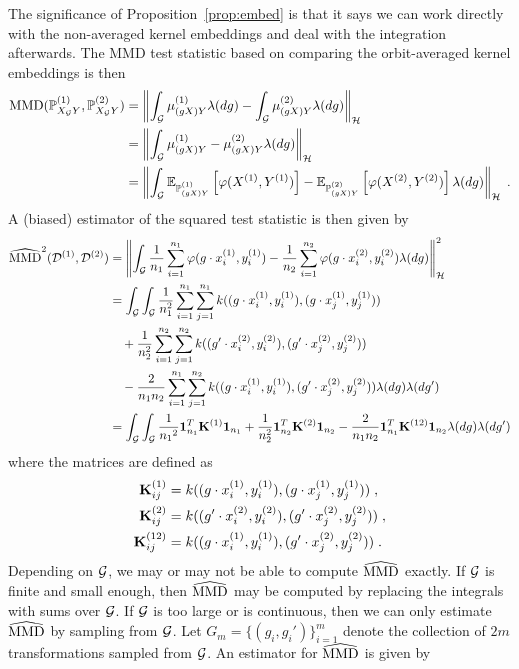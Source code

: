 The significance of Proposition~\ref{prop:embed} is that it says we can work directly with the non-averaged kernel embeddings and deal with the integration afterwards. The MMD test statistic based on comparing the orbit-averaged kernel embeddings is then
\begin{align*}
\mathrm{MMD}(\mathbb{P}_{X_{\mathcal{G}} Y}^{(1)},\mathbb{P}_{X_{\mathcal{G}} Y}^{(2)}) &= \left\|\int_{\mathcal{G}}\mu_{(gX)Y}^{(1)}\lambda(dg) - \int_{\mathcal{G}}\mu_{(gX)Y}^{(2)}\lambda(dg)\right\|_{\mathcal{H}} \\
&= \left\|\int_{\mathcal{G}}\mu_{(gX)Y}^{(1)} - \mu_{(gX)Y}^{(2)}\lambda(dg)\right\|_{\mathcal{H}} \\
&= \left\|\int_{\mathcal{G}}\mathbb{E}_{\mathbb{P}_{(gX)Y}^{(1)}}\left[\varphi(X^{(1)},Y^{(1)})\right] - \mathbb{E}_{\mathbb{P}_{(gX)Y}^{(2)}}\left[\varphi(X^{(2)},Y^{(2)})\right]\lambda(dg)\right\|_{\mathcal{H}} \;.
\end{align*}
A (biased) estimator of the squared test statistic is then given by
\begin{align*}
\widehat{\mathrm{MMD}}^2(\mathcal{D}^{(1)},\mathcal{D}^{(2)}) &= \left\|\int_{\mathcal{G}}\frac{1}{n_1}\sum_{i=1}^{n_1}\varphi(g\cdot x^{(1)}_i,y^{(1)}_i) - \frac{1}{n_2}\sum_{i=1}^{n_2}\varphi(g\cdot x^{(2)}_i,y^{(2)}_i)\lambda(dg)\right\|_{\mathcal{H}}^2 \\
&= \int_{\mathcal{G}}\int_{\mathcal{G}} \frac{1}{n_1^2}\sum_{i=1}^{n_1}\sum_{j=1}^{n_1}k((g\cdot x^{(1)}_i,y^{(1)}_i),(g\cdot x^{(1)}_j,y^{(1)}_j)) \\
&\quad + \frac{1}{n_2^2}\sum_{i=1}^{n_2}\sum_{j=1}^{n_2}k((g'\cdot x^{(2)}_i, y^{(2)}_i),(g'\cdot x^{(2)}_j, y^{(2)}_j)) \\
&\quad - \frac{2}{n_1n_2}\sum_{i=1}^{n_1}\sum_{j=1}^{n_2}k((g\cdot x^{(1)}_i, y^{(1)}_i),(g'\cdot x^{(2)}_j, y^{(2)}_j)) \lambda(dg)\lambda(dg') \\
&= \int_{\mathcal{G}}\int_{\mathcal{G}} \frac{1}{{n_1}^2}\mathbf{1}_{n_1}^T\mathbf{K}^{(1)}\mathbf{1}_{n_1} + \frac{1}{n_2^2}\mathbf{1}_{n_2}^T\mathbf{K}^{(2)}\mathbf{1}_{n_2} - \frac{2}{n_1n_2}\mathbf{1}_{n_1}^T\mathbf{K}^{(12)}\mathbf{1}_{n_2} \lambda(dg)\lambda(dg')
\end{align*}
where the matrices are defined as
\begin{align*}
\mathbf{K}^{(1)}_{ij} &= k((g\cdot x^{(1)}_i,y^{(1)}_i),(g\cdot x^{(1)}_j,y^{(1)}_j)) \;, \\
\mathbf{K}^{(2)}_{ij} &= k((g'\cdot x^{(2)}_i, y^{(2)}_i),(g'\cdot x^{(2)}_j, y^{(2)}_j)) \;, \\
\mathbf{K}^{(12)}_{ij} &= k((g\cdot x^{(1)}_i, y^{(1)}_i),(g'\cdot x^{(2)}_j, y^{(2)}_j)) \;.
\end{align*}
Depending on $\mathcal{G}$, we may or may not be able to compute $\widehat{\mathrm{MMD}}$ exactly. If $\mathcal{G}$ is finite and small enough, then $\widehat{\mathrm{MMD}}$ may be computed by replacing the integrals with sums over $\mathcal{G}$. If $\mathcal{G}$ is too large or is continuous, then we can only estimate $\widehat{\mathrm{MMD}}$ by sampling from $\mathcal{G}$. Let $G_m=\{(g_i,g_i')\}_{i=1}^m$ denote the collection of $2m$ transformations sampled from $\mathcal{G}$. An estimator for $\widehat{\mathrm{MMD}}$ is given by
